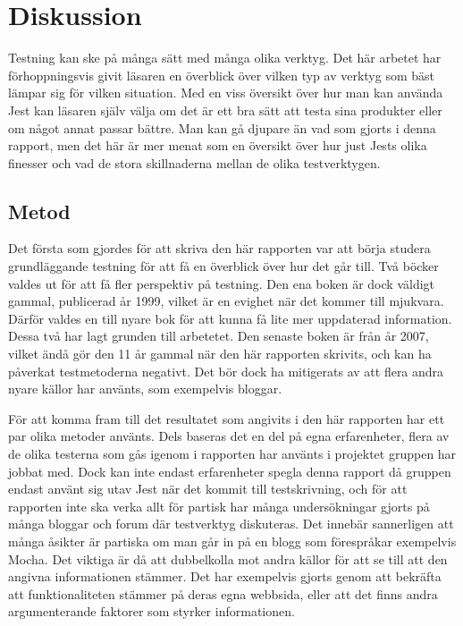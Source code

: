 \section{Diskussion}
\label{sec:david-discussion}
Testning kan ske på många sätt med många olika verktyg. Det här arbetet har förhoppningsvis givit läsaren en överblick över vilken typ av verktyg som bäst lämpar sig för vilken situation. Med en viss översikt över hur man kan använda Jest kan läsaren själv välja om det är ett bra sätt att testa sina produkter eller om något annat passar bättre. Man kan gå djupare än vad som gjorts i denna rapport, men det här är mer menat som en översikt över hur just Jests olika finesser och vad de stora skillnaderna mellan de olika testverktygen.

\subsection{Metod}
\label{subsec:david-discussion-method}
Det första som gjordes för att skriva den här rapporten var att börja studera grundläggande testning för att få en överblick över hur det går till. Två böcker valdes ut \cite{ADP} \cite{book-sta} för att få fler perspektiv på testning. Den ena boken är dock väldigt gammal, publicerad år 1999, vilket är en evighet när det kommer till mjukvara. Därför valdes en till nyare bok för att kunna få lite mer uppdaterad information. Dessa två har lagt grunden till arbetetet. Den senaste boken är från år 2007, vilket ändå gör den 11 år gammal när den här rapporten skrivits, och kan ha påverkat testmetoderna negativt. Det bör dock ha mitigerats av att flera andra nyare källor har använts, som exempelvis bloggar.

För att komma fram till det resultatet som angivits i den här rapporten har ett par olika metoder använts. Dels baseras det en del på egna erfarenheter, flera av de olika testerna som gås igenom i rapporten har använts i projektet gruppen har jobbat med. Dock kan inte endast erfarenheter spegla denna rapport då gruppen endast använt sig utav Jest när det kommit till testskrivning, och för att rapporten inte ska verka allt för partisk har många undersökningar gjorts på många bloggar och forum där testverktyg diskuteras. Det innebär sannerligen att många åsikter är partiska om man går in på en blogg som förespråkar exempelvis Mocha. Det viktiga är då att dubbelkolla mot andra källor för att se till att den angivna informationen stämmer. Det har exempelvis gjorts genom att bekräfta att funktionaliteten stämmer på deras egna webbsida, eller att det finns andra argumenterande faktorer som styrker informationen.

